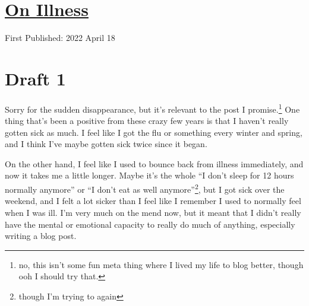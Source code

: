 \documentclass[12pt]{article}[titlepage]
\newcommand{\say}[1]{``#1''}
\newcommand{\1}{\={a}}
\newcommand{\2}{\={e}}
\newcommand{\3}{\={\i}}
\newcommand{\4}{\=o}
\newcommand{\5}{\=u}
\newcommand{\6}{\={A}}
\renewcommand{\,}{\textsuperscript{,}}
\begin{document}
\doublespacing
\section{\href{illness.html}{On Illness}}
First Published: 2022 April 18


\section{Draft 1}
Sorry for the sudden disappearance, but it's relevant to the post I promise.\footnote{no, this isn't some fun meta thing where I lived my life to blog better, though ooh I should try that.}
One thing that's been a positive from these crazy few years is that I haven't really gotten sick as much.
I feel like I got the flu or something every winter and spring, and I think I've maybe gotten sick twice since it began.

On the other hand, I feel like I used to bounce back from illness immediately, and now it takes me a little longer.
Maybe it's the whole \say{I don't sleep for 12 hours normally anymore} or \say{I don't eat as well anymore}\footnote{though I'm trying to again}, but I got sick over the weekend, and I felt a lot sicker than I feel like I remember I used to normally feel when I was ill.
I'm very much on the mend now, but it meant that I didn't really have the mental or emotional capacity to really do much of anything, especially writing a blog post.
\end{document}

